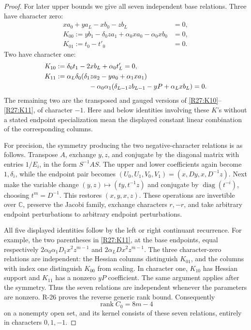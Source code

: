 \begin{proof}
For later upper bounds we give all seven independent base
relations. Three have character zero:
\begin{align}
 xa_0+ya_L-xb_0-zb_L&=0,\label{R27:scaling_base}\\
 K_{00}:=yb_1-\delta_0za_1+\alpha_0xa_0-\alpha_0xb_0&=0,
                                                    \label{R27:K00}\\
 K_{01}:=t_0-t'_0&=0.                              \label{R27:K01}
\end{align}
Two have character one:
\begin{align}
 K_{10}&:=\delta_0t_1-2xb_L+\alpha_0t'_L=0,
                                                    \label{R27:K10}\\
 K_{11}&:=\alpha_L\delta_0
       (\delta_1za_2-ya_0+\alpha_1xa_1)\notag\\
 &\hspace{17mm}-\alpha_0\alpha_1
       (\delta_{L-1}zb_{L-1}-yP+\alpha_Lxb_L)=0.
                                                    \label{R27:K11}
\end{align}
The remaining two are the transposed and gauged versions of
\eqref{R27:K10}--\eqref{R27:K11}, of character $-1$.
Here and below identities involving these $K$'s without a stated
endpoint specialization mean the displayed constant linear
combination of the corresponding columns.

For precision, the symmetry producing the two negative-character
relations is as follows. Transpose $A$, exchange $y,z$, and
conjugate by the diagonal matrix with entries $1/E_i$, in the
form $S^{-1}AS$. The upper and lower coefficients again become
$1,\delta_i$, while the endpoint pair becomes
$(U_0,U_1,V_0,V_1)=(x,Dy,x,D^{-1}z)$.
Next make the variable change $(y,z)\mapsto(ty,t^{-1}z)$ and
conjugate by $\operatorname{diag}(t^{-i})$, choosing
$t^m=D^{-1}$. This restores $(x,y,x,z)$. These operations are
invertible over $\mathbb C$, preserve the Jacobi family, exchange
characters $r,-r$, and take arbitrary endpoint perturbations to
arbitrary endpoint perturbations.

All five displayed identities follow by the left or right
continuant recurrence. For example, the two parentheses in
\eqref{R27:K11}, at the base endpoints, equal respectively
$2\alpha_0\alpha_1D_1x^2z^{m-1}$ and
$2\alpha_LDx^2z^{m-1}$. The three character-zero relations are
independent: the Hessian columns distinguish $K_{01}$, and the
columns with index one distinguish $K_{00}$ from scaling.
In character one, $K_{10}$ has Hessian support and $K_{11}$ has
a nonzero $yP$ coefficient. The same argument applies after the
symmetry. Thus the seven relations are independent whenever the
parameters are nonzero. R-26 proves the reverse generic rank
bound. Consequently
\begin{equation}\label{R27:base_rank}
 \operatorname{rank}C_0=8m-4
\end{equation}
on a nonempty open set, and its kernel consists of these seven
relations, entirely in characters $0,1,-1$.


\end{proof}
